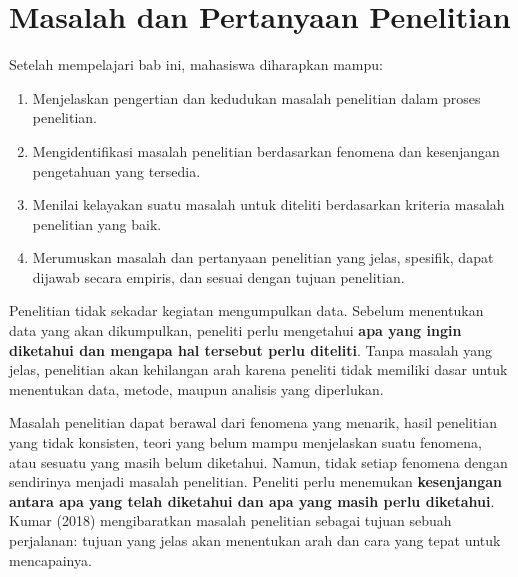 \documentclass[
  indonesian,
  letterpaper,
  DIV=11,
  numbers=noendperiod]{scrreprt}
\providecommand{\tightlist}{%
  \setlength{\itemsep}{0pt}\setlength{\parskip}{0pt}}
\begin{document}
\chapter{Masalah dan Pertanyaan
Penelitian}\label{masalah-dan-pertanyaan-penelitian}

\begin{tcolorbox}[enhanced jigsaw, colframe=quarto-callout-note-color-frame, toptitle=1mm, breakable, leftrule=.75mm, arc=.35mm, toprule=.15mm, colback=white, colbacktitle=quarto-callout-note-color!10!white, bottomtitle=1mm, bottomrule=.15mm, titlerule=0mm, title=\textcolor{quarto-callout-note-color}{\faInfo}\hspace{0.5em}{Capaian Pembelajaran}, coltitle=black, left=2mm, opacitybacktitle=0.6, opacityback=0, rightrule=.15mm]

Setelah mempelajari bab ini, mahasiswa diharapkan mampu:

\begin{enumerate}
\def\labelenumi{\arabic{enumi}.}
\tightlist
\item
  Menjelaskan pengertian dan kedudukan masalah penelitian dalam proses
  penelitian.
\item
  Mengidentifikasi masalah penelitian berdasarkan fenomena dan
  kesenjangan pengetahuan yang tersedia.
\item
  Menilai kelayakan suatu masalah untuk diteliti berdasarkan kriteria
  masalah penelitian yang baik.
\item
  Merumuskan masalah dan pertanyaan penelitian yang jelas, spesifik,
  dapat dijawab secara empiris, dan sesuai dengan tujuan penelitian.
\end{enumerate}

\end{tcolorbox}

Penelitian tidak sekadar kegiatan mengumpulkan data. Sebelum menentukan
data yang akan dikumpulkan, peneliti perlu mengetahui \textbf{apa yang
ingin diketahui dan mengapa hal tersebut perlu diteliti}. Tanpa masalah
yang jelas, penelitian akan kehilangan arah karena peneliti tidak
memiliki dasar untuk menentukan data, metode, maupun analisis yang
diperlukan.

Masalah penelitian dapat berawal dari fenomena yang menarik, hasil
penelitian yang tidak konsisten, teori yang belum mampu menjelaskan
suatu fenomena, atau sesuatu yang masih belum diketahui. Namun, tidak
setiap fenomena dengan sendirinya menjadi masalah penelitian. Peneliti
perlu menemukan \textbf{kesenjangan antara apa yang telah diketahui dan
apa yang masih perlu diketahui}. Kumar (2018) mengibaratkan masalah
penelitian sebagai tujuan sebuah perjalanan: tujuan yang jelas akan
menentukan arah dan cara yang tepat untuk mencapainya.
\end{document}
